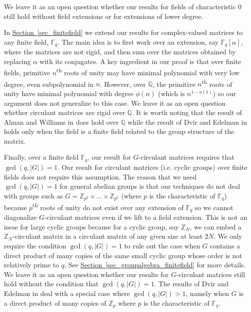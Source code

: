 \documentclass[11pt]{article}
\numberwithin{equation}{section}
\theoremstyle{definition}
\theoremstyle{plain}
\newcommand{\Q}{\mathbb Q}
\newcommand{\Z}{\mathbb Z}
\newcommand{\expref}[2]{\hyperref[#2]{#1~\ref{#2}}}
\theoremstyle{definition}
\newcommand\F{{\mathbb{F}}}
\renewcommand\Q{{\mathbb{Q}}}
\renewcommand\Z{{\mathbb{Z}}}
\newcommand{\ts}{\textsuperscript}
\begin{document}
%
%
%
%
%
We leave it as an open question whether our results for fields of characteristic $0$ still hold without field extensions or for extensions of lower degree.

In \expref{Section}{sec_finitefield} we  
extend our results for complex-valued matrices to any finite field, $\F_q$.  The main idea is to first work over an extension, say $\F_q[\alpha]$, where the matrices are not rigid, and then sum over the matrices obtained by replacing $\alpha$ with its conjugates.  A key ingredient in our proof is that over finite fields, primitive $n$\ts{th}
roots of unity may have minimal polynomial with very low degree, even subpolynomial in $n$.  However, over $\Q$, the primitive $n$\ts{th} roots of unity have minimal polynomial with degree $\phi(n)$ (which is $n^{1-o(1)}$) so our argument does not generalize to this case.  We leave it as an open question whether
%
%
%
circulant   %
matrices are rigid over $\Q$.  It is worth noting that the result of Alman and Williams in \cite{old_hadamard} does hold over $\Q$ while the result of Dvir and Edelman in \cite{CLP} holds only when the field is a finite field related to the group structure of the matrix.

%
%
%
%


Finally, over a finite field $\F_q$, our result for $G$-circulant matrices requires that $\gcd(q,|G|) = 1$.  Our result for circulant matrices (i.e. cyclic groups) over finite fields does not require this assumption.  The reason that we need $\gcd(q,|G|) = 1$ for general abelian groups is that our techniques do not deal with groups such as $G = \Z_{p^2} \times \dots \times \Z_{p^2}$ (where $p$ is the characteristic of $\F_q$) because $p$\ts{th} roots of unity do not exist over any extension of $\F_q$ so we cannot diagonalize $G$-circulant matrices even if we lift to a field extension.  This is not an issue for large cyclic groups because for a cyclic group, say $\Z_N$, we can embed a $\Z_N$-circulant matrix in a circulant matrix of any given size at least $2N$.  We only require the condition $\gcd(q,|G|) = 1$ to rule out the case when $G$ contains a direct product of many copies of the same small cyclic group whose order is not relatively prime to $q$.  See \expref{Section}{sec_groupalgebra_finitefield} for more details.  We leave it as an open question whether our results for $G$-circulant matrices still hold without the condition that $\gcd(q,|G|) = 1$.  The results of Dvir and Edelman in \cite{CLP} deal with a special case where $\gcd(q,|G|) > 1$, namely when $G$ is a direct product of many copies of $\Z_p$ where $p$ is the characteristic of $\F_q$.
\end{document}

